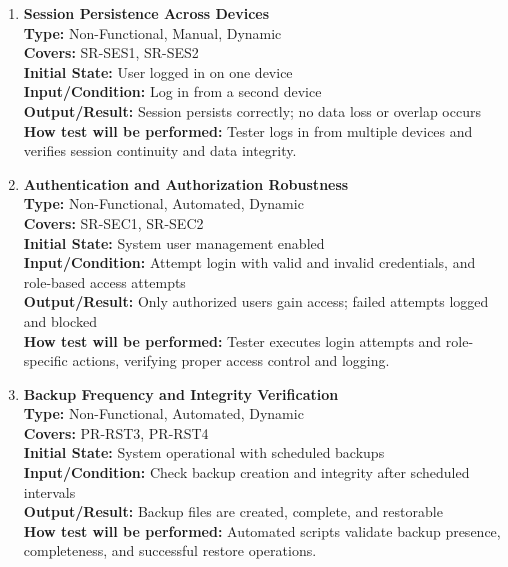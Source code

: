 \documentclass[12pt, titlepage]{article}
\begin{document}
\begin{enumerate}[label=NFR-ST \arabic*., wide=0pt, leftmargin=*]
  \item \textbf{Session Persistence Across Devices} \\[2mm]
    \textbf{Type:} Non-Functional, Manual, Dynamic \\
    \textbf{Covers:} SR-SES1, SR-SES2 \\
    \textbf{Initial State:} User logged in on one device \\
    \textbf{Input/Condition:} Log in from a second device \\
    \textbf{Output/Result:} Session persists correctly; no data loss
    or overlap occurs \\[2mm]
    \textbf{How test will be performed:} Tester logs in from multiple
    devices and verifies session continuity and data integrity.

  \item \textbf{Authentication and Authorization Robustness} \\[2mm]
    \textbf{Type:} Non-Functional, Automated, Dynamic \\
    \textbf{Covers:} SR-SEC1, SR-SEC2 \\
    \textbf{Initial State:} System user management enabled \\
    \textbf{Input/Condition:} Attempt login with valid and invalid
    credentials, and role-based access attempts \\
    \textbf{Output/Result:} Only authorized users gain access; failed
    attempts logged and blocked \\[2mm]
    \textbf{How test will be performed:} Tester executes login
    attempts and role-specific actions, verifying proper access
    control and logging.

  \item \textbf{Backup Frequency and Integrity Verification} \\[2mm]
    \textbf{Type:} Non-Functional, Automated, Dynamic \\
    \textbf{Covers:} PR-RST3, PR-RST4 \\
    \textbf{Initial State:} System operational with scheduled backups \\
    \textbf{Input/Condition:} Check backup creation and integrity
    after scheduled intervals \\
    \textbf{Output/Result:} Backup files are created, complete, and
    restorable \\[2mm]
    \textbf{How test will be performed:} Automated scripts validate
    backup presence, completeness, and successful restore operations.


\end{enumerate}
\end{document}
